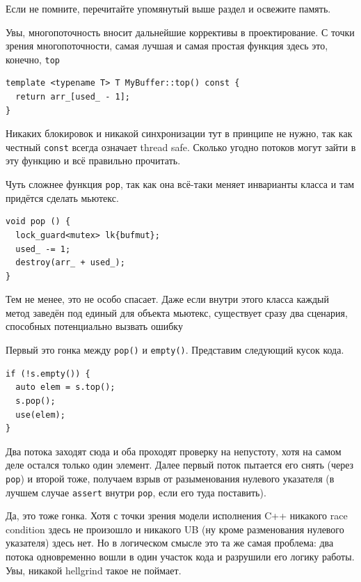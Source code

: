\documentclass[a4paper,12pt,oneside]{book}
\newif\ifanswers
\begin{document}
\ifanswers
Правильный ответ: потому что безопасность исключений
\fi

Если не помните, перечитайте упомянутый выше раздел и освежите память. 

Увы, многопоточность вносит дальнейшие коррективы в проектирование. С точки зрения многопоточности, самая лучшая и самая простая функция здесь это, конечно, \lstinline!top! 

\begin{lstlisting}
template <typename T> T MyBuffer::top() const {
  return arr_[used_ - 1];
}
\end{lstlisting}

Никаких блокировок и никакой синхронизации тут в принципе не нужно, так как честный \lstinline!const! всегда означает thread safe. Сколько угодно потоков могут зайти в эту функцию и всё правильно прочитать.

Чуть сложнее функция \lstinline!pop!, так как она всё-таки меняет инварианты класса и там придётся сделать мьютекс.

\begin{lstlisting}
void pop () {
  lock_guard<mutex> lk{bufmut};
  used_ -= 1;
  destroy(arr_ + used_);
}
\end{lstlisting}

Тем не менее, это не особо спасает. Даже если внутри этого класса каждый метод заведён под единый для объекта мьютекс, существует сразу два сценария, способных потенциально вызвать ошибку

Первый это гонка между \lstinline!pop()! и \lstinline!empty()!. Представим следующий кусок кода.

\begin{lstlisting}
if (!s.empty()) {
  auto elem = s.top();
  s.pop();
  use(elem);
}
\end{lstlisting}

Два потока заходят сюда и оба проходят проверку на непустоту, хотя на самом деле остался только один элемент. Далее первый поток пытается его снять (через \lstinline!pop!) и второй тоже, получаем взрыв от разыменования нулевого указателя (в лучшем случае \lstinline!assert! внутри \lstinline!pop!, если его туда поставить).

Да, это тоже гонка. Хотя с точки зрения модели исполнения C++ никакого race condition здесь не произошло и никакого UB (ну кроме разменования нулевого указателя) здесь нет. Но в логическом смысле это та же самая проблема: два потока одновременно вошли в один участок кода и разрушили его логику работы. Увы, никакой hellgrind такое не поймает.
\end{document}
